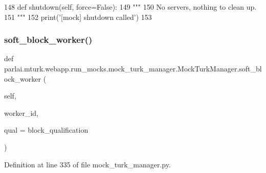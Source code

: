 \begin{DoxyCode}
148     \textcolor{keyword}{def }shutdown(self, force=False):
149         \textcolor{stringliteral}{"""}
150 \textcolor{stringliteral}{        No servers, nothing to clean up.}
151 \textcolor{stringliteral}{        """}
152         print(\textcolor{stringliteral}{'[mock] shutdown called'})
153 
\end{DoxyCode}
\mbox{\label{classparlai_1_1mturk_1_1webapp_1_1run__mocks_1_1mock__turk__manager_1_1MockTurkManager_a87d4a0329159fcc488e360672d8b9c56}} 
\subsubsection{\texorpdfstring{soft\+\_\+block\+\_\+worker()}{soft\_block\_worker()}}
{\footnotesize\ttfamily def parlai.\+mturk.\+webapp.\+run\+\_\+mocks.\+mock\+\_\+turk\+\_\+manager.\+Mock\+Turk\+Manager.\+soft\+\_\+block\+\_\+worker (\begin{DoxyParamCaption}\item[{}]{self,  }\item[{}]{worker\+\_\+id,  }\item[{}]{qual = {\ttfamily \textquotesingle{}block\+\_\+qualification\textquotesingle{}} }\end{DoxyParamCaption})}



Definition at line 335 of file mock\+\_\+turk\+\_\+manager.\+py.


